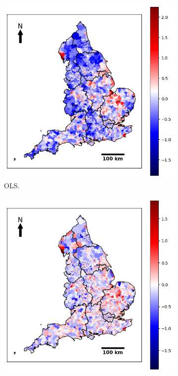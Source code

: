 \clearpage
\begin{figure}[ht]
\centering
\begin{subfigure}{.4\textwidth}
  \centering
  \includegraphics[width=1\linewidth]{ucl-latex-thesis-templates-master/Image/resi_OLS_1.png}
  \caption{OLS.}
  \label{fig:A4.71}
\end{subfigure}%
\begin{subfigure}{.4\textwidth}
  \centering
  \includegraphics[width=1\linewidth]{ucl-latex-thesis-templates-master/Image/resi_SLM_2.png}

\end{subfigure}
\end{figure}
